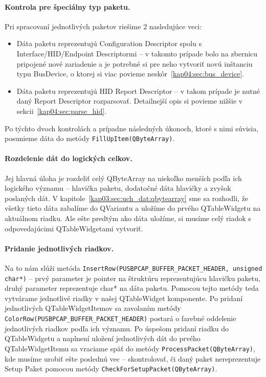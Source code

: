 \paragraph{Kontrola pre špeciálny typ paketu.}
\hfill \break
Pri spracovaní jednotlivých paketov riešime 2 nasledujúce veci:
\begin{itemize}
\item Dáta paketu reprezentujú Configuration Descriptor spolu s Interface/HID/\newline Endpoint Descriptormi -- v takomto prípade bolo na zbernicu pripojené nové zariadenie a je potrebné si pre neho vytvoriť novú inštanciu typu BusDevice, o ktorej si viac povieme neskôr~\ref{kap04:sec:bus_device}.
\item Dáta paketu reprezentujú HID Report Descriptor -- v takom prípade je nutné daný Report Descriptor rozparsovať. Detailnejší opis si povieme nižšie v sekcii~\ref{kap04:sec:parse_hid}.
\end{itemize}
Po týchto dvoch kontrolách a prípadne následných úkonoch, ktoré s nimi súvisia, posunieme dáta do metódy \texttt{FillUpItem(QByteArray)}.  

\paragraph{Rozdelenie dát do logických celkov.}
\hfill \break
Jej hlavná úloha je rozdeliť celý QByteArray na niekoľko menších podľa ich logického významu -- hlavička paketu, dodatočné dáta hlavičky a zvyšok poslaných dát. V kapitole~\ref{kap03:sec:uch_dat:qbytearray} sme sa rozhodli, že všetky tieto dáta zabalíme do QVariantu a uložíme do prvého QTableWidgetu na aktuálnom riadku. Ale ešte predtým ako dáta uložíme, si musíme celý riadok s odpovedajúcimi QTableWidgetami vytvoriť.

\paragraph{Pridanie jednotlivých riadkov.}
\hfill \break
Na to nám slúži metóda \texttt{InsertRow(PUSBPCAP\_BUFFER\_PACKET\_HEADER, \newline unsigned char*)} -- prvý parameter je pointer na štruktúru reprezentujúcu hlavičku paketu, druhý parameter reprezentuje char* na dáta paketu. Pomocou tejto metódy teda vytvárame jednotlivé riadky v našej QTableWidget komponente. Po pridaní jednotlivých QTableWidgetItemov sa zavolaním metódy \newline\texttt{ColorRow(PUSBPCAP\_BUFFER\_PACKET\_HEADER)} postará o farebné oddelenie jednotlivých riadkov podľa ich významu. Po úspešom pridaní riadku do QTableWidgetu a naplnení uložení jednotlivých dát do prvého QTableWidgetItemu sa vraciame späť do metódy \texttt{ProcessPacket(QByteArray)}, kde musíme urobiť ešte poslednú vec -- skontrolovať, či daný paket nereprezentuje Setup Paket pomocou metódy \texttt{CheckForSetupPacket(QByteArray)}. 

